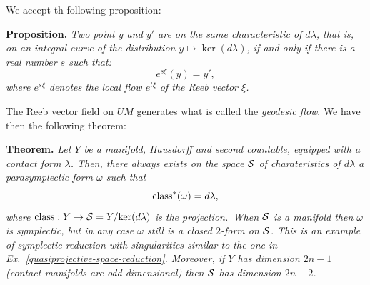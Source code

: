 We accept th following proposition:

\textbf{Proposition.} {\it Two point $y$ and $y'$ are on the same characteristic of $d\lambda$,
that is,
on an integral curve of the distribution $y \mapsto \ker(d\lambda)$,
if and only if there is a real number $s$ such that:
$$
  e^{s\xi}(y) = y',
  $$
where $e^{s\xi}$ denotes the local flow $e^{t\xi}$ of the Reeb vector $\xi$.
}

The Reeb vector field on $UM$ generates what is called the \emph{geodesic flow}.
We have then the following theorem:

\textbf{Theorem.} {\it Let $Y$ be a manifold,
Hausdorff and second countable,
equipped with a contact form $\lambda$.
Then,
there always exists on the space $\mathcal{S}$ of charateristics of $d\lambda$ a parasymplectic form $\omega$ such that
$$
\operatorname{class}^*(\omega) = d\lambda,
$$
where $\operatorname{class} : Y \to \mathcal{S} = Y/\mathrm{ker}(d\lambda)$ is the projection.\,%
When $\mathcal{S}$ is a manifold then $\omega$ is symplectic,
but in any case $\omega$ still is a closed $2$-form on $\mathcal{S}$.
This is an example of \emph{symplectic reduction} with singularities similar to the one in Ex.~\ref{quasiprojective-space-reduction}.
Moreover,
if $Y$ has dimension $2n-1$ (contact manifolds are odd dimensional) then $\mathcal{S}$ has dimension $2n-2$.
}

